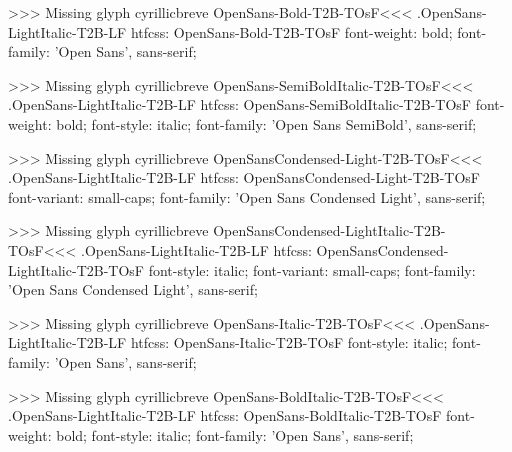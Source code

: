 >>>
Missing glyph	cyrillicbreve
\<OpenSans-Bold-T2B-TOsF\><<<
.OpenSans-LightItalic-T2B-LF
htfcss:  OpenSans-Bold-T2B-TOsF  font-weight: bold; font-family: 'Open Sans', sans-serif;

>>>
Missing glyph	cyrillicbreve
\<OpenSans-SemiBoldItalic-T2B-TOsF\><<<
.OpenSans-LightItalic-T2B-LF
htfcss:  OpenSans-SemiBoldItalic-T2B-TOsF  font-weight: bold; font-style: italic; font-family: 'Open Sans SemiBold', sans-serif;

>>>
Missing glyph	cyrillicbreve
\<OpenSansCondensed-Light-T2B-TOsF\><<<
.OpenSans-LightItalic-T2B-LF
htfcss:  OpenSansCondensed-Light-T2B-TOsF  font-variant: small-caps; font-family: 'Open Sans Condensed Light', sans-serif;

>>>
Missing glyph	cyrillicbreve
\<OpenSansCondensed-LightItalic-T2B-TOsF\><<<
.OpenSans-LightItalic-T2B-LF
htfcss:  OpenSansCondensed-LightItalic-T2B-TOsF  font-style: italic; font-variant: small-caps; font-family: 'Open Sans Condensed Light', sans-serif;

>>>
Missing glyph	cyrillicbreve
\<OpenSans-Italic-T2B-TOsF\><<<
.OpenSans-LightItalic-T2B-LF
htfcss:  OpenSans-Italic-T2B-TOsF  font-style: italic; font-family: 'Open Sans', sans-serif;

>>>
Missing glyph	cyrillicbreve
\<OpenSans-BoldItalic-T2B-TOsF\><<<
.OpenSans-LightItalic-T2B-LF
htfcss:  OpenSans-BoldItalic-T2B-TOsF  font-weight: bold; font-style: italic; font-family: 'Open Sans', sans-serif;

